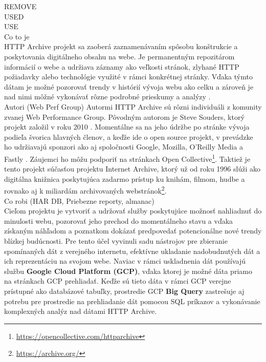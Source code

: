 {REMOVE 
\cite{httparchive-homepage}
\\
USED
\cite{httparchive-faq}
\cite{httparchive-about}
\\
USE
\cite{httparchive-methodology}
\cite{httparchive-harfile}
\\
Co to je
\\
HTTP Archive projekt sa zaoberá zaznamenávaním spôsobu konštrukcie a poskytovania digitálneho obsahu na webe. Je permanentným repozitárom informácií o webe a udržiava záznamy ako veľkosti
stránok, zlyhané HTTP požiadavky alebo technológie využité v rámci konkrétnej stránky. Vďaka týmto dátam je možné pozorovať trendy v histórií vývoja webu ako celku a zároveň je nad nimi môžné vykonávať
rôzne podrobné prieskumy a analýzy \cite{httparchive-about}. 
\\
Autori (Web Perf Group)
Autormi HTTP Archive sú rôzni individuáli z komunity zvanej Web Performance Group. Pôvodným autorom je Steve Souders, ktorý projekt založil v roku 2010 \cite{httparchive-faq}.
Momentálne sa na jeho údržbe po stránke vývoja podieľa švorica hlavných členov, a keďže ide o open source projekt, v prevádzke ho udržiavajú sponzori ako aj spoločnosti Google, Mozilla, O'Reilly Media a Fastly \cite{httparchive-about}. Záujemci ho môžu podporiť na stránkach Open Collective\footnote{\href{https://opencollective.com/httparchive}{https://opencollective.com/httparchive}}.
Taktiež je tento projekt súčasťou projektu Internet Archive, ktorý už od roku 1996 slúži ako digitálna knižnica poskytujúca zadarmo prístup ku knihám, filmom, hudbe a rovnako aj k miliardám archivovaných webstránok\footnote{\href{https://archive.org/}{https://archive.org/}}.
\\
Co robi (HAR DB, Priebezne reporty, almanac)
\\
Cieľom projektu je vytvoriť a udržovať služby poskytujúce možnosť nahliadnuť do minulosti webu, pozorovať jeho prechod do momentálneho stavu a vďaka získaným náhľadom a poznatkom dokázať
predpovedať potencionálne nové trendy blízkej budúcnosti. 
Pre tento účel vyvinuli sadu nástrojov pre zbieranie spomínaných dát z verejného internetu, efektívne ukladanie nadobudnutých dát a ich reprezentáciu na svojom webe.
Naviac v rámci uskladnenia dát používajú službu \textbf{Google Cloud Platform (GCP)}, vďaka ktorej je možné dáta priamo na stránkach GCP prehliadať.
Keďže sú tieto dáta v rámci GCP verejne prístupné ako databázové tabuľky, prostredie GCP \textbf{Big Query} zastrešuje aj potrebu pre prostredie na prehliadanie dát pomocou SQL príkazov 
a vykonávanie komplexných analýz nad dátami HTTP Archive.

}
